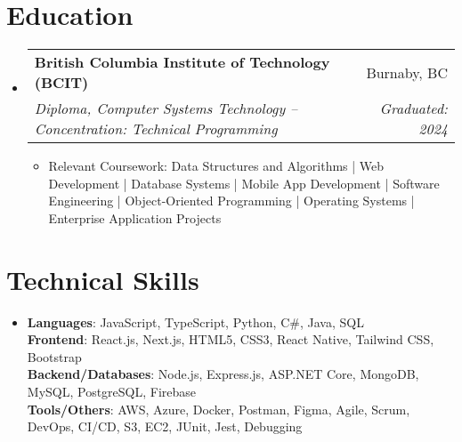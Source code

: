\documentclass[letterpaper,11pt]{article}
\makeatletter
\newcommand{\resumeItem}[1]{
\item\small{
{#1 \vspace{-2pt}}
}
}
\newcommand{\resumeSubheading}[4]{
\vspace{-2pt}\item
\begin{tabular*}{0.97\textwidth}[t]{l@{\extracolsep{\fill}}r}
\textbf{#1} & #2 \\
\textit{\small#3} & \textit{\small #4} \\
\end{tabular*}\vspace{-7pt}
}
\newcommand{\resumeSubHeadingListStart}{\begin{itemize}[leftmargin=0.15in, label={}]}
\newcommand{\resumeSubHeadingListEnd}{\end{itemize}}
\newcommand{\resumeItemListStart}{\begin{itemize}}
\newcommand{\resumeItemListEnd}{\end{itemize}\vspace{-5pt}}
\makeatother
\begin{document}
\section{Education}
\resumeSubHeadingListStart
\resumeSubheading{British Columbia Institute of Technology (BCIT)}{Burnaby, BC}{Diploma, Computer Systems Technology – Concentration: Technical Programming}{Graduated: 2024}
\resumeItemListStart
\resumeItem{Relevant Coursework: Data Structures and Algorithms | Web Development | Database Systems | Mobile App Development | Software Engineering | Object-Oriented Programming | Operating Systems | Enterprise Application Projects}
\resumeItemListEnd
\resumeSubHeadingListEnd

\section{Technical Skills}
\begin{itemize}[leftmargin=0.15in, label={}]
\item{
\textbf{Languages}{: JavaScript, TypeScript, Python, C\#, Java, SQL} \\
\textbf{Frontend}{: React.js, Next.js, HTML5, CSS3, React Native, Tailwind CSS, Bootstrap} \\
\textbf{Backend/Databases}{: Node.js, Express.js, ASP.NET Core, MongoDB, MySQL, PostgreSQL, Firebase} \\
\textbf{Tools/Others}{: AWS, Azure, Docker, Postman, Figma, Agile, Scrum, DevOps, CI/CD, S3, EC2, JUnit, Jest, Debugging}
} \\
\end{itemize}


\end{document}
